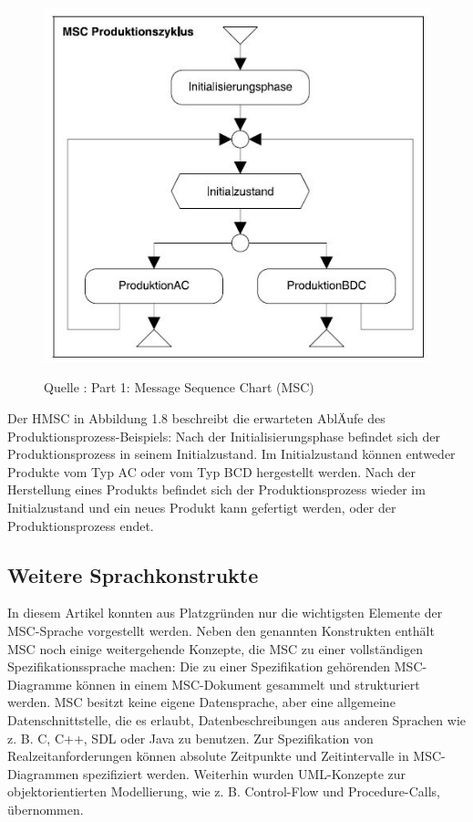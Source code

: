 \begin{center}
\begin{figure}[h]
   

\includegraphics[scale=1]{Graphics/HMSC.jpg}



Quelle : \cite{MT009}
Part 1: Message Sequence Chart (MSC) 

 
\label{fig9}


\end{figure}

\end{center}
\newpage
Der HMSC in Abbildung 1.8 beschreibt die erwarteten AblÄufe
des Produktionsprozess-Beispiels: Nach der Initialisierungsphase
befindet sich der Produktionsprozess in seinem
Initialzustand. Im Initialzustand können entweder Produkte
vom Typ AC oder vom Typ BCD hergestellt werden. Nach
der Herstellung eines Produkts befindet sich der Produktionsprozess
wieder im Initialzustand und ein neues Produkt
kann gefertigt werden, oder der Produktionsprozess endet.

\subsection{Weitere Sprachkonstrukte}
In diesem Artikel konnten aus Platzgründen nur die
wichtigsten Elemente der MSC-Sprache vorgestellt werden.
Neben den genannten Konstrukten enthält MSC
noch einige weitergehende Konzepte, die MSC zu einer
vollständigen Spezifikationssprache machen: Die zu einer
Spezifikation gehörenden MSC-Diagramme können in
einem MSC-Dokument gesammelt und strukturiert werden.
MSC besitzt keine eigene Datensprache, aber eine
allgemeine Datenschnittstelle, die es erlaubt, Datenbeschreibungen
aus anderen Sprachen wie z. B. C, C++, SDL
oder Java zu benutzen. Zur Spezifikation von Realzeitanforderungen
können absolute Zeitpunkte und Zeitintervalle
in MSC-Diagrammen spezifiziert werden. Weiterhin wurden
UML-Konzepte zur objektorientierten Modellierung,
wie z. B. Control-Flow und Procedure-Calls, übernommen.\cite{MT009}





